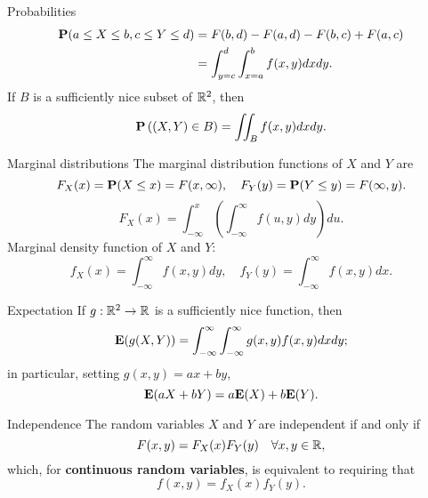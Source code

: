 \begin{newnotion}{Probabilities}
\begin{equation*}
    \begin{aligned} 
        \mathbf{P}(a \leq X \leq b, c \leq Y \leq d) &=F(b, d)-F(a, d)-F(b, c)+F(a, c) \\ 
        &=\int_{y=c}^{d} \int_{x=a}^{b} f(x, y) d x d y. \end{aligned}
\end{equation*}
If $B$ is a sufficiently nice subset of $\mathbb{R}^2$, then
\begin{equation*}
    \mathbf{P} \left( (X, Y) \in B \right)=\iint_{B} f(x, y) d x d y.
\end{equation*}
\end{newnotion}
\begin{newnotion}{Marginal distributions}
The marginal distribution functions of $X$ and $Y$ are
\begin{equation*}
    F_{X}(x)=\mathbf{P}(X \leq x)=F(x, \infty), \quad F_{Y}(y)=\mathbf{P}(Y \leq y)=F(\infty, y). 
\end{equation*}
\begin{equation*}
    F_{X}(x)=\int_{-\infty}^{x}\left(\int_{-\infty}^{\infty} f(u, y) d y\right) d u.
\end{equation*}
Marginal density function of $X$ and $Y$:
\begin{equation*}
    f_{X}(x)=\int_{-\infty}^{\infty} f(x, y) d y, \quad f_{Y}(y)=\int_{-\infty}^{\infty} f(x, y) d x.
\end{equation*}
\end{newnotion}

\begin{newnotion}{Expectation}
If $g: \mathbb{R}^2 \to \mathbb{R}$ is a sufficiently nice function, then 
\begin{equation*}
    \mathbf{E}(g(X, Y))=\int_{-\infty}^{\infty} \int_{-\infty}^{\infty} g(x, y) f(x, y) d x d y;
\end{equation*}
in particular, setting $g(x, y) = ax + by$, 
\begin{equation*}
    \mathbf{E}(aX+bY) = a\mathbf{E}(X) + b\mathbf{E}(Y).
\end{equation*}
\end{newnotion}

\begin{newnotion}{Independence}
The random variables $X$ and $Y$ are independent if and only if 
\begin{equation*}
    F(x,y) = F_X(x) F_Y(y) \quad \forall x, y \in \mathbb{R},
\end{equation*}
which, for \textbf{continuous random variables}, is equivalent to requiring that 
\begin{equation*}
    f(x,y) = f_X(x) f_Y(y).
\end{equation*}
\end{newnotion}
 
